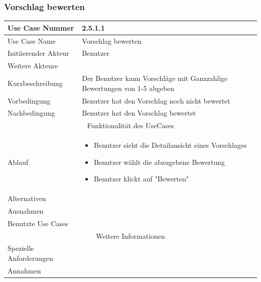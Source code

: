\documentclass[10pt,a4paper]{article}
\begin{document}
\subsubsection{Vorschlag bewerten}
		\begin{tabular}{|l|p{.5\linewidth}|}
		\hline Use Case Nummer & 2.5.1.1 \\ 
		\hline Use Case Name & Vorschlag bewerten \\ 
		\hline Initiierender Akteur & Benutzer \\
		\hline Weitere Akteure &  \\
		\hline Kurzbeschreibung & Der Benutzer kann Vorschl\"age mit Ganzzahlige Bewertungen von 1-5 abgeben \\
		\hline Vorbedingung & Benutzer hat den Vorschlag noch nicht bewertet \\
		\hline Nachbedingung & Benutzer hat den Vorschlag bewertet \\
		\hline \multicolumn{2}{|c|}{Funktionalität des UseCases}\\
		\hline Ablauf & \begin{itemize}
			\item Benutzer sieht die Detailansicht eines Vorschlages
			\item Benutzer w\"ahlt die abzugebene Bewertung
			\item Benutzer klickt auf "Bewerten"
		\end{itemize} \\
		\hline Alternativen &  \\
		\hline Ausnahmen &  \\
		\hline Benutzte Use Cases &  \\
		\hline \multicolumn{2}{|c|}{Weitere Informationen} \\
		\hline Spezielle Anforderungen &  \\
		\hline Annahmen &  \\
		\hline
		\end{tabular}
\end{document}

